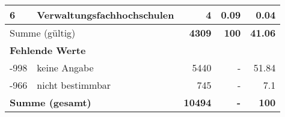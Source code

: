 \begin{longtable}{lXrrr}
     6 &
     \multicolumn{1}{X}{ Verwaltungsfachhochschulen   } &


       \num{4} &
       \num[round-mode=places,round-precision=2]{0.09} &
         \num[round-mode=places,round-precision=2]{0.04} \\
     \midrule
     \multicolumn{2}{l}{Summe (gültig)} &
       \textbf{\num{4309}} &
     \textbf{\num{100}} &
       \textbf{\num[round-mode=places,round-precision=2]{41.06}} \\
     \multicolumn{5}{l}{\textbf{Fehlende Werte}}\\
       -998 &
       keine Angabe &
         \num{5440} &
        - &
         \num[round-mode=places,round-precision=2]{51.84} \\
       -966 &
       nicht bestimmbar &
         \num{745} &
        - &
         \num[round-mode=places,round-precision=2]{7.1} \\
     \midrule
     \multicolumn{2}{l}{\textbf{Summe (gesamt)}} &
          \textbf{\num{10494}} &
        \textbf{-} &
        \textbf{\num{100}} \\
     \bottomrule
     \end{longtable}
     
